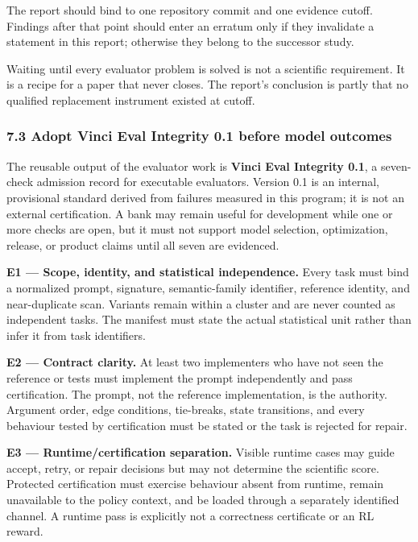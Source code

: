 \documentclass[
]{article}
\begin{document}
The report should bind to one repository commit and one evidence cutoff.
Findings after that point should enter an erratum only if they
invalidate a statement in this report; otherwise they belong to the
successor study.

Waiting until every evaluator problem is solved is not a scientific
requirement. It is a recipe for a paper that never closes. The report's
conclusion is partly that no qualified replacement instrument existed at
cutoff.

\subsubsection{7.3 Adopt Vinci Eval Integrity 0.1 before model
outcomes}\label{73-adopt-vinci-eval-integrity-01-before-model-outcomes}

The reusable output of the evaluator work is \textbf{Vinci Eval
Integrity 0.1}, a seven-check admission record for executable
evaluators. Version 0.1 is an internal, provisional standard derived
from failures measured in this program; it is not an external
certification. A bank may remain useful for development while one or
more checks are open, but it must not support model selection,
optimization, release, or product claims until all seven are evidenced.

\textbf{E1 --- Scope, identity, and statistical independence.} Every
task must bind a normalized prompt, signature, semantic-family
identifier, reference identity, and near-duplicate scan. Variants remain
within a cluster and are never counted as independent tasks. The
manifest must state the actual statistical unit rather than infer it
from task identifiers.

\textbf{E2 --- Contract clarity.} At least two implementers who have not
seen the reference or tests must implement the prompt independently and
pass certification. The prompt, not the reference implementation, is the
authority. Argument order, edge conditions, tie-breaks, state
transitions, and every behaviour tested by certification must be stated
or the task is rejected for repair.

\textbf{E3 --- Runtime/certification separation.} Visible runtime cases
may guide accept, retry, or repair decisions but may not determine the
scientific score. Protected certification must exercise behaviour absent
from runtime, remain unavailable to the policy context, and be loaded
through a separately identified channel. A runtime pass is explicitly
not a correctness certificate or an RL reward.
\end{document}
